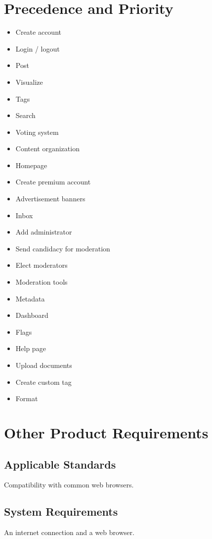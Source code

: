 \documentclass [a4paper, 12pt] {article}
\begin{document}
\section{Precedence and Priority}
\begin{itemize}
		\item Create account
		\item Login / logout
		\item Post
		\item Visualize
		\item Tags
		\item Search
		\item Voting system
		\item Content organization
		\item Homepage
		\item Create premium account
		\item Advertisement banners
		\item Inbox
		\item Add administrator
		\item Send candidacy for moderation
		\item Elect moderators
		\item Moderation tools
		\item Metadata
		\item Dashboard
		\item Flags
		\item Help page
		\item Upload documents
		\item Create custom tag
		\item Format
\end{itemize}



\section{Other Product Requirements}
\subsection{Applicable Standards}
Compatibility with common web browsers.

\subsection{System Requirements}
An internet connection and a web browser.

\end{document}
